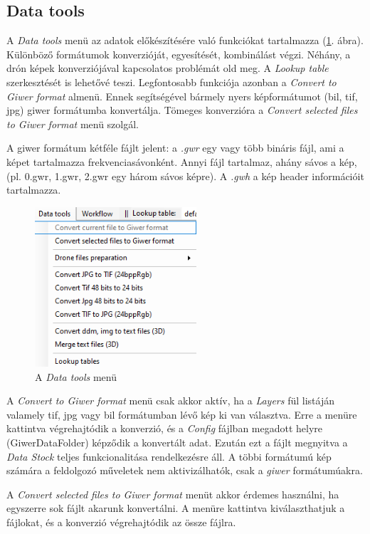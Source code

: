 \documentclass[a4paper,12pt]{book}
\begin{document}
\subsection{Data tools}

A \textit{Data tools} menü az adatok előkészítésére való funkciókat tartalmazza (\ref{fig:datatools_menu}. ábra). Különböző formátumok konverzióját, egyesítését, kombinálást végzi. Néhány, a drón képek konverziójával kapcsolatos problémát old meg. A \textit{Lookup table} szerkesztését is lehetővé teszi. Legfontosabb funkciója azonban a \textit{Convert to Giwer format} almenü. Ennek segítségével bármely nyers képformátumot (bil, tif, jpg) giwer formátumba konvertálja. Tömeges konverzióra a \textit{Convert selected files to Giwer format} menü szolgál.

A giwer formátum kétféle fájlt jelent: a \textit{.gwr} egy vagy több bináris fájl, ami a képet tartalmazza frekvenciasávonként. Annyi fájl tartalmaz, ahány sávos a kép, (pl. 0.gwr, 1.gwr, 2.gwr egy három sávos képre). A \textit{.gwh} a kép header információit tartalmazza.

	\begin{figure}
		\centering
		\includegraphics[width=6cm]{datatools_menu.png}
		\caption{A \textit{Data tools} menü}
		\label{fig:datatools_menu}
	\end{figure}



A \textit{Convert to Giwer format} menü csak akkor aktív, ha a \textit{Layers} fül listáján valamely tif, jpg vagy bil formátumban lévő kép ki van választva. Erre a menüre kattintva végrehajtódik a konverzió, és a \textit{Config} fájlban megadott helyre (GiwerDataFolder) képződik a konvertált adat. Ezután ezt a fájlt megnyitva a \textit{Data Stock} teljes funkcionalitása rendelkezésre áll. A többi formátumú kép számára a feldolgozó műveletek nem aktivizálhatók, csak a \textit{giwer} formátumúakra.

A \textit{Convert selected files to Giwer format} menüt akkor érdemes használni, ha egyszerre sok fájlt akarunk konvertálni. A menüre kattintva kiválaszthatjuk a fájlokat, és a konverzió végrehajtódik az össze fájlra.
\end{document}
